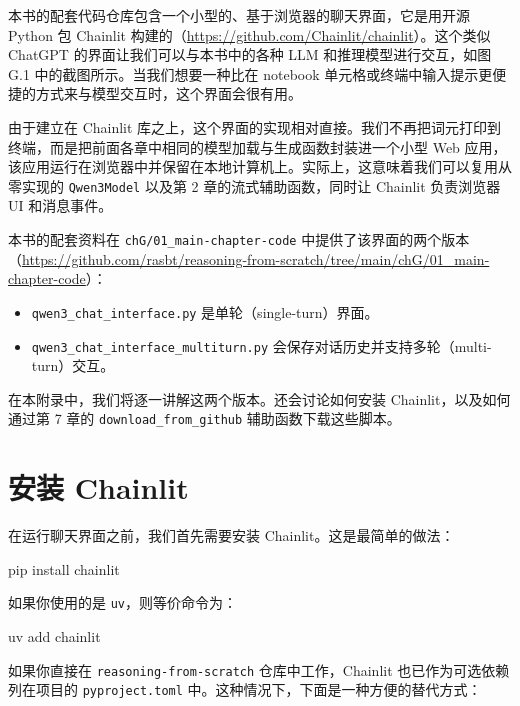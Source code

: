 本书的配套代码仓库包含一个小型的、基于浏览器的聊天界面，它是用开源 Python 包 Chainlit 构建的（\href{https://github.com/Chainlit/chainlit}{https://github.com/Chainlit/chainlit}）。这个类似 ChatGPT 的界面让我们可以与本书中的各种 LLM 和推理模型进行交互，如图 G.1 中的截图所示。当我们想要一种比在 notebook 单元格或终端中输入提示更便捷的方式来与模型交互时，这个界面会很有用。


由于建立在 Chainlit 库之上，这个界面的实现相对直接。我们不再把词元打印到终端，而是把前面各章中相同的模型加载与生成函数封装进一个小型 Web 应用，该应用运行在浏览器中并保留在本地计算机上。实际上，这意味着我们可以复用从零实现的 \texttt{Qwen3Model} 以及第 2 章的流式辅助函数，同时让 Chainlit 负责浏览器 UI 和消息事件。

本书的配套资料在 \texttt{chG/01\_main-chapter-code} 中提供了该界面的两个版本（\href{https://github.com/rasbt/reasoning-from-scratch/tree/main/chG/01\_main-chapter-code}{https://github.com/rasbt/reasoning-from-scratch/tree/main/chG/01\_main-chapter-code}）：

\begin{itemize}
\item \texttt{qwen3\_chat\_interface.py} 是单轮（single-turn）界面。
\item \texttt{qwen3\_chat\_interface\_multiturn.py} 会保存对话历史并支持多轮（multi-turn）交互。
\end{itemize}

在本附录中，我们将逐一讲解这两个版本。还会讨论如何安装 Chainlit，以及如何通过第 7 章的 \texttt{download\_from\_github} 辅助函数下载这些脚本。

\section{安装 Chainlit}

在运行聊天界面之前，我们首先需要安装 Chainlit。这是最简单的做法：

\begin{codebox}
pip install chainlit
\end{codebox}

如果你使用的是 \texttt{uv}，则等价命令为：

\begin{codebox}
uv add chainlit
\end{codebox}

如果你直接在 \texttt{reasoning-from-scratch} 仓库中工作，Chainlit 也已作为可选依赖列在项目的 \texttt{pyproject.toml} 中。这种情况下，下面是一种方便的替代方式：

